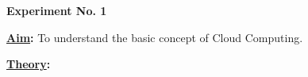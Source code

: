 \documentclass[letterpaper,12pts, Ti]{article}
\begin{document}
	\begin{center}
	 \textbf{Experiment No. 1}
	\end{center}
	\textbf{\underline{Aim}:} To understand the basic concept of Cloud Computing.
	
	\textbf{\underline{Theory}:}
\end{document}
